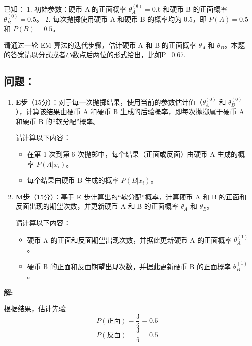 \documentclass[8pt]{article}
\begin{document}
已知：
1. 初始参数：硬币 A 的正面概率 \( \theta_A^{(0)} = 0.6 \) 和硬币 B 的正面概率 \( \theta_B^{(0)} = 0.5 \)。
2. 每次抛掷使用硬币 A 和硬币 B 的概率均为 0.5，即 \( P(A) = 0.5 \) 和 \( P(B) = 0.5 \)。

请通过一轮 EM 算法的迭代步骤，估计硬币 A 和 B 的正面概率 \( \theta_A \) 和 \( \theta_B \)。本题的答案请以分式或者小数点后两位的形式给出，比如P=0.67.

\subsection*{问题：}

\begin{enumerate}
    \item \textbf{E步}（15分）：对于每一次抛掷结果，使用当前的参数估计值（\( \theta_A^{(0)} \) 和 \( \theta_B^{(0)} \)），计算该结果由硬币 A 和硬币 B 生成的后验概率，即每次抛掷属于硬币 A 和硬币 B 的“软分配”概率。
    
    请计算以下内容：
    \begin{itemize}
        \item 在第 1 次到第 6 次抛掷中，每个结果（正面或反面）由硬币 A 生成的概率 \( P(A | x_i) \)。
        \item 每个结果由硬币 B 生成的概率 \( P(B | x_i) \)。
    \end{itemize}

    \item \textbf{M步}（15分）：基于 E 步计算出的“软分配”概率，计算硬币 A 和 B 的正面和反面出现的期望次数，并更新硬币 A 和 B 的正面概率 \( \theta_A \) 和 \( \theta_B \)。

    请计算以下内容：
    \begin{itemize}
        \item 硬币 A 的正面和反面期望出现次数，并据此更新硬币 A 的正面概率 \( \theta_A^{(1)} \)。
        \item 硬币 B 的正面和反面期望出现次数，并据此更新硬币 B 的正面概率 \( \theta_B^{(1)} \)。
    \end{itemize}
\end{enumerate}

\textbf{\large 解:}

根据结果，估计先验：
\[P(\text{正面}) = \frac{3}{6} = 0.5\]
\[P(\text{反面}) = \frac{3}{6} = 0.5\]
\end{document}

